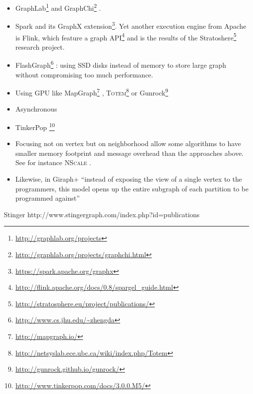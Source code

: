 \begin{itemize}
	\item
		GraphLab\footnote{\href{http://graphlab.org/projects/source.html}{http://graphlab.org/projects}}%
		\autocites{Low2010}{Gonzalez2012}{Low2012}{GraphLab13Low} and
		GraphChi\footnote{\href{http://graphlab.org/projects/graphchi.html}{http://graphlab.org/projects/graphchi.html}}
		\autocite{Kyrola2012}.
	\item
		Spark \autocite{Zaharia2010} and its GraphX
		extension\footnote{\href{https://spark.apache.org/graphx}{https://spark.apache.org/graphx}}.
		Yet another execution engine from Apache is Flink,  which feature a
		graph
		API\footnote{\href{http://flink.apache.org/docs/0.8/spargel_guide.html}%
			{http://flink.apache.org/docs/0.8/spargel\_guide.html}} and is the
		results of the Stratoshere\footnote{\href{http://stratosphere.eu/project/publications/}%
			{http://stratosphere.eu/project/publications/}} research project.
	\item FlashGraph\footnote{\href{http://www.cs.jhu.edu/~zhengda/\#FlashGraph}%
			{\url{http://www.cs.jhu.edu/~zhengda}}} \autocite{FlashGraph14}:
		using SSD disks instead of memory to store large graph without
		compromising too much performance.
	\item Using GPU like MapGraph\footnote{\href{http://mapgraph.io/}{http://mapgraph.io/}}
		\autocite{Fu2014},
		\textsc{Totem}\footnote{\href{http://netsyslab.ece.ubc.ca/wiki/index.php/Totem}%
			{http://netsyslab.ece.ubc.ca/wiki/index.php/Totem}}
		\autocite{Gharaibeh2013} or
		Gunrock\footnote{\href{http://gunrock.github.io/gunrock/}%
			{http://gunrock.github.io/gunrock/}} \autocite{Gunrock15}
	\item Asynchronous \autocite{Wang2013}
	\item TinkerPop \footnote{\href{http://www.tinkerpop.com/docs/3.0.0.M5/}%
			{http://www.tinkerpop.com/docs/3.0.0.M5/}}
	\item Focusing not on vertex but on neighborhood allow some algorithms to
		have smaller memory footprint and message overhead than the approaches
		above. See for instance \textsc{NScale} \autocite{Quamar2014}.
	\item Likewise, in Giraph+ \autocite{Tian2013} \enquote{instead of
		exposing the view of a single vertex to the programmers, this
		model opens up the entire subgraph of each partition to be
		programmed against}
\end{itemize}

Stinger http://www.stingergraph.com/index.php?id=publications

